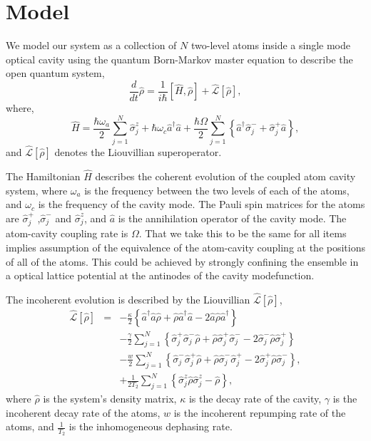 \documentclass[aps,prl,twocolumn,
superscriptaddress,groupedaddress]{revtex4}
\begin{document}
\section{Model}

We model our system as a collection of $N$ two-level atoms inside a
single mode optical cavity using the quantum Born-Markov master equation
to describe the open quantum system,
\begin{equation}
  \frac{d}{dt} \hat{\rho} =
  \frac{1}{i \hbar} \left[ \hat{H}, \hat{\rho} \right] +
  \hat{\mathcal{L}}\left[ \hat{\rho} \right],
\label{ME1Crossover}
\end{equation}
where,
\begin{equation}
\hat{H} = \frac{\hbar \omega_a}{2} \sum_{j=1}^{N} \hat{\sigma}^{z}_{j}
+ \hbar \omega_c \hat{a}^{\dagger}\hat{a}
+ \frac{\hbar \Omega}{2}  \sum_{j=1}^{N} \left\{
    \hat{a}^{\dagger} \hat{\sigma}^{-}_{j} +
    \hat{\sigma}^{+}_{j} \hat{a} \right\},
\end{equation}
and $\hat{\mathcal{L}}\left[ \hat{\rho} \right]$ denotes the
Liouvillian superoperator.

The Hamiltonian $\hat{H}$ describes the coherent evolution of the
coupled atom cavity system, where $\omega_{a}$ is the frequency
between the two levels of each of the atoms, and $\omega_c$ is the
frequency of the cavity mode. The Pauli spin matrices for the atoms
are $\hat{\sigma}_j^{+}$ ,$\hat{\sigma}_j^{-}$ and
$\hat{\sigma}_j^{z}$, and $\hat{a}$ is the annihilation operator of
the cavity mode. The atom-cavity coupling rate is $\Omega$. That we
take this to be the same for all items implies assumption of the
equivalence of the atom-cavity coupling at the positions of all of the
atoms. This could be achieved by strongly confining the ensemble in a
optical lattice potential at the antinodes of the cavity modefunction.

The incoherent evolution is described by the Liouvillian
$\hat{\mathcal{L}}\left[ \hat{\rho} \right]$,
\begin{eqnarray}
\hat{\mathcal{L}}\left[ \hat{\rho} \right] &=&
  -\frac{\kappa}{2}
  \left\{
    \hat{a}^{\dagger} \hat{a} \hat{\rho}
    + \hat{\rho}  \hat{a}^{\dagger} \hat{a}
    - 2\hat{a} \hat{\rho} \hat{a}^{\dagger}
  \right\}
\nonumber
\\
 &&-\frac{\gamma}{2} \sum_{j=1}^N
  \left\{
   \hat{\sigma}_{j}^{+} \hat{\sigma}_{j}^{-} \hat{\rho}
   + \hat{\rho} \hat{\sigma}_{j}^{+} \hat{\sigma}_{j}^{-}
   - 2\hat{\sigma}_{j}^{-} \hat{\rho} \hat{\sigma}_{j}^{+}
  \right\}
\nonumber
\\
 &&-\frac{w}{2} \sum_{j=1}^N
  \left\{
   \hat{\sigma}_{j}^{-} \hat{\sigma}_{j}^{+} \hat{\rho}
   + \hat{\rho} \hat{\sigma}_{j}^{-} \hat{\sigma}_{j}^{+}
   - 2\hat{\sigma}_{j}^{+} \hat{\rho}  \hat{\sigma}_{j}^{-}
  \right\},
\nonumber
\\
 &&+\frac{1}{2T_2} \sum_{j=1}^N
  \left\{
   \hat{\sigma}_{j}^{z} \hat{\rho}  \hat{\sigma}_{j}^{z} - \hat{\rho}
  \right\},
\end{eqnarray}
where $\hat{\rho}$ is the system's density matrix, $\kappa$ is the decay
rate of the cavity, $\gamma$ is the incoherent decay rate of the atoms,
$w$ is the incoherent repumping rate of the atoms, and $\frac{1}{T_2}$
is the inhomogeneous dephasing rate.
\end{document}

